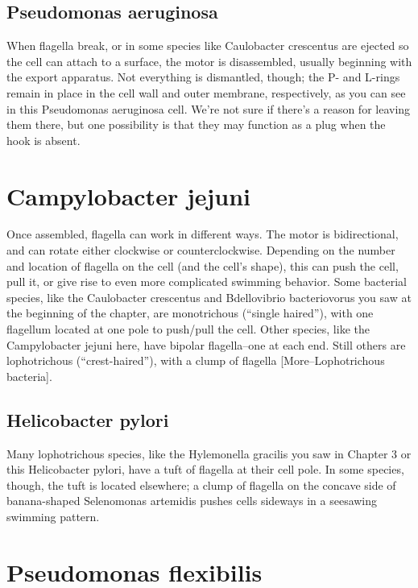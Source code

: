 \documentclass[]{tufte-book}
\begin{document}
\subsection{Pseudomonas aeruginosa}\label{Flagellar_motor_disassembly}

When flagella break, or in some species like Caulobacter crescentus are
ejected so the cell can attach to a surface, the motor is disassembled,
usually beginning with the export apparatus. Not everything is
dismantled, though; the P- and L-rings remain in place in the cell wall
and outer membrane, respectively, as you can see in this Pseudomonas
aeruginosa cell. We're not sure if there's a reason for leaving them
there, but one possibility is that they may function as a plug when the
hook is absent.

\section{Campylobacter jejuni}\label{campylobacter-jejuni-1}

Once assembled, flagella can work in different ways. The motor is
bidirectional, and can rotate either clockwise or counterclockwise.
Depending on the number and location of flagella on the cell (and the
cell's shape), this can push the cell, pull it, or give rise to even
more complicated swimming behavior. Some bacterial species, like the
Caulobacter crescentus and Bdellovibrio bacteriovorus you saw at the
beginning of the chapter, are monotrichous (``single haired''), with one
flagellum located at one pole to push/pull the cell. Other species, like
the Campylobacter jejuni here, have bipolar flagella--one at each end.
Still others are lophotrichous (``crest-haired''), with a clump of
flagella {[}More--Lophotrichous bacteria{]}.

\subsection{Helicobacter pylori}\label{Lophotrichous_bacteria}

Many lophotrichous species, like the Hylemonella gracilis you saw in
Chapter 3 or this Helicobacter pylori, have a tuft of flagella at their
cell pole. In some species, though, the tuft is located elsewhere; a
clump of flagella on the concave side of banana-shaped Selenomonas
artemidis pushes cells sideways in a seesawing swimming pattern.

\section{Pseudomonas flexibilis}\label{pseudomonas-flexibilis}
\end{document}
